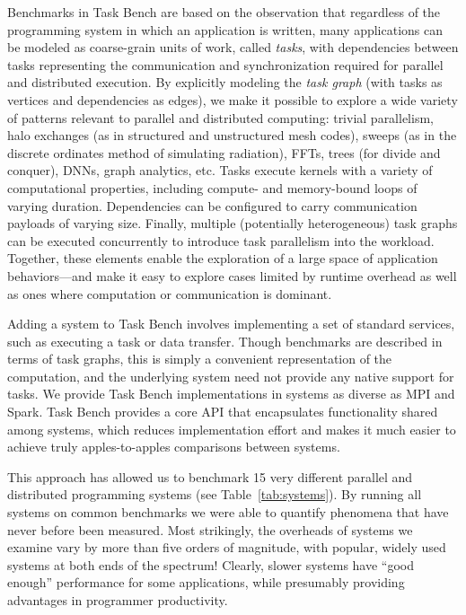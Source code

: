 Benchmarks in Task Bench are based on the observation that regardless
of the programming system in which an application is written, many
applications can be modeled as coarse-grain units of work, called
\emph{tasks}, with dependencies between tasks representing the
communication and synchronization required for parallel and
distributed execution. By explicitly modeling the \emph{task graph}
(with tasks as vertices and dependencies as edges), we make it
possible to explore a wide variety of patterns relevant to
parallel and distributed computing: trivial parallelism, halo exchanges (as
in structured and unstructured mesh codes), sweeps (as
in the discrete ordinates method of simulating radiation), FFTs, trees
(for divide and conquer), DNNs, graph analytics, etc. Tasks execute kernels with a
variety of computational properties, including compute- and
memory-bound loops of varying duration. Dependencies can be configured to carry communication payloads of varying size. Finally, multiple
(potentially heterogeneous) task graphs can be executed concurrently
to introduce task parallelism into the workload. Together, these
elements enable the exploration of a large space of application
behaviors---and make it easy to explore cases limited by runtime
overhead as well as ones where computation or communication is
dominant.

Adding a system to Task Bench involves implementing a set of standard
services, such as executing a task or data transfer. Though
benchmarks are described in terms of task graphs, this is simply a
convenient representation of the computation, and the underlying
system need not provide any native support for tasks. We provide
Task Bench implementations in systems as diverse as MPI and
Spark. Task Bench provides a core API that encapsulates functionality
shared among systems, which reduces implementation effort and makes it
much easier to achieve truly apples-to-apples comparisons between
systems.

This approach has allowed us to benchmark 15 very different parallel
and distributed programming systems (see
Table~\ref{tab:systems}).  By running all systems on common benchmarks
we were able to quantify phenomena
that have never before been measured.
Most strikingly, the overheads of systems we examine vary by more than five orders
of magnitude, with popular, widely used systems at both ends of the spectrum!  Clearly,
slower systems have ``good enough'' performance for some applications, while presumably
providing advantages in programmer productivity.

